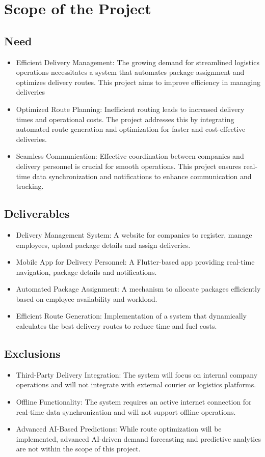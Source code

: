 \section{Scope of the Project}
\subsection{Need}
\begin{itemize}
    \item Efficient Delivery Management: The growing demand for streamlined logistics operations necessitates a system that automates package assignment and optimizes delivery routes. This project aims to improve efficiency in managing deliveries
    \item Optimized Route Planning: Inefficient routing leads to increased delivery times and operational costs. The project addresses this by integrating automated route generation and optimization for faster and cost-effective deliveries.
    \item Seamless Communication: Effective coordination between companies and delivery personnel is crucial for smooth operations. This project ensures real-time data synchronization and notifications to enhance communication and tracking.
\end{itemize}
\subsection{Deliverables}
\begin{itemize}
    \item  Delivery Management System: A website for companies to register, manage employees, upload package details and assign deliveries.
    \item Mobile App for Delivery Personnel: A Flutter-based app providing real-time navigation, package details and notifications.
    \item Automated Package Assignment: A mechanism to allocate packages efficiently based on employee availability and workload.
    \item Efficient Route Generation: Implementation of a system that dynamically calculates the best delivery routes to reduce time and fuel costs.
\end{itemize}
\subsection{Exclusions}
\begin{itemize}
    \item Third-Party Delivery Integration: The system will focus on internal company operations and will not integrate with external courier or logistics platforms.
    \item Offline Functionality: The system requires an active internet connection for real-time data synchronization and will not support offline operations.
    \item Advanced AI-Based Predictions: While route optimization will be implemented, advanced AI-driven demand forecasting and predictive analytics are not within the scope of this project.
\end{itemize}
